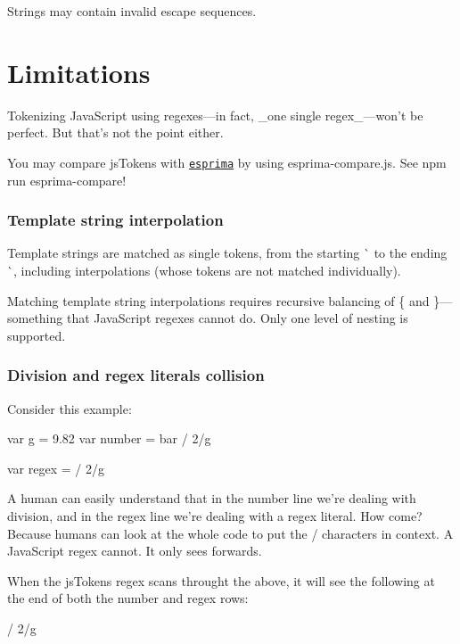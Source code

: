 Strings may contain invalid escape sequences.

\section*{Limitations }

Tokenizing Java\+Script using regexes—in fact, \+\_\+one single regex\+\_\+—won’t be perfect. But that’s not the point either.

You may compare js\+Tokens with \href{http://esprima.org/}{\tt esprima} by using {\ttfamily esprima-\/compare.\+js}. See {\ttfamily npm run esprima-\/compare}!

\subsubsection*{Template string interpolation}

Template strings are matched as single tokens, from the starting {\ttfamily \`{}} to the ending {\ttfamily \`{}}, including interpolations (whose tokens are not matched individually).

Matching template string interpolations requires recursive balancing of {\ttfamily \{} and {\ttfamily \}}—something that Java\+Script regexes cannot do. Only one level of nesting is supported.

\subsubsection*{Division and regex literals collision}

Consider this example\+:


\begin{DoxyCode}
var g = 9.82
var number = bar / 2/g

var regex = / 2/g
\end{DoxyCode}


A human can easily understand that in the {\ttfamily number} line we’re dealing with division, and in the {\ttfamily regex} line we’re dealing with a regex literal. How come? Because humans can look at the whole code to put the {\ttfamily /} characters in context. A Java\+Script regex cannot. It only sees forwards.

When the {\ttfamily js\+Tokens} regex scans throught the above, it will see the following at the end of both the {\ttfamily number} and {\ttfamily regex} rows\+:


\begin{DoxyCode}
/ 2/g
\end{DoxyCode}


